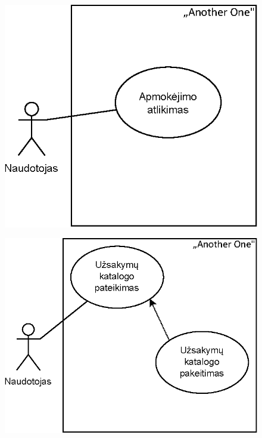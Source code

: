 \documentclass{VUMIFPSkursinis}
\begin{document}
\begin{figure}[H]
    \centering
    \includegraphics[scale=1]{img/ProductUseCase3}
\end{figure}
\begin{figure}[H]
    \centering
    \includegraphics[scale=1]{img/ProductUseCase4}
\end{figure}
\end{document}
